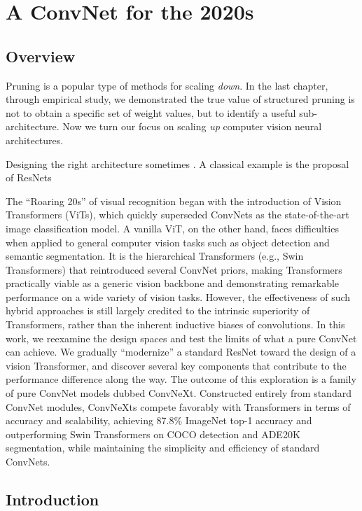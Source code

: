 \chapter{A ConvNet for the 2020s}

\section{Overview}
Pruning is a popular type of methods for scaling \emph{down}. In the last chapter, through empirical study, we demonstrated the true value of structured pruning is not to obtain a specific set of weight values, but to identify a useful sub-architecture. Now we turn our focus on scaling \emph{up} computer vision neural architectures. 

Designing the right architecture sometimes . A classical example is the proposal of ResNets~\cite{}

The ``Roaring 20s'' of visual recognition began with the introduction of Vision Transformers (ViTs), which quickly superseded ConvNets as the state-of-the-art image classification model. A vanilla ViT, on the other hand, faces difficulties when applied to general computer vision tasks such as object detection and semantic segmentation. It is the hierarchical Transformers (e.g., Swin Transformers) that reintroduced several ConvNet priors, making Transformers practically viable as a generic vision backbone and demonstrating remarkable performance on a wide variety of vision tasks. However, the effectiveness of such hybrid approaches is still largely credited to the intrinsic superiority of Transformers, rather than the inherent inductive biases of convolutions. In this work, we reexamine the design spaces and test the limits of what a pure ConvNet can achieve. We gradually ``modernize'' a standard ResNet toward the design of a vision Transformer, and discover several key components that contribute to the performance difference along the way. The outcome of this exploration is a family of pure ConvNet models dubbed ConvNeXt. Constructed entirely from standard ConvNet modules, ConvNeXts compete favorably with Transformers in terms of accuracy and scalability, achieving 87.8\% ImageNet top-1 accuracy and outperforming Swin Transformers on COCO detection and ADE20K segmentation, while maintaining the simplicity and efficiency of standard ConvNets. 


\section{Introduction}
\label{sec:intro}

